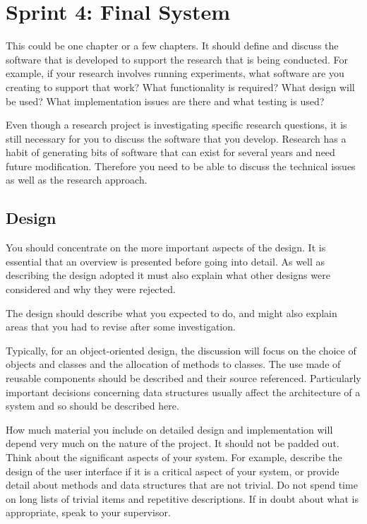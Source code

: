 \chapter{Sprint 4: Final System}

This could be one chapter or a few chapters. It should define and discuss the software that is developed to support the research that is being conducted. For example, if your research involves running experiments, what software are you creating to support that work? What functionality is required? What design will be used? What implementation issues are there and what testing is used? 

Even though a research project is investigating specific research questions, it is still necessary for you to discuss the software that you develop. Research has a habit of generating bits of software that can exist for several years and need future modification. Therefore you need to be able to discuss the technical issues as well as the research approach. 

\section{Design}
You should concentrate on the more important aspects of the design. It is essential that an overview is presented before going into detail. As well as describing the design adopted it must also explain what other designs were considered and why they were rejected.

The design should describe what you expected to do, and might also explain areas that you had to revise after some investigation.

Typically, for an object-oriented design, the discussion will focus on the choice of objects and classes and the allocation of methods to classes. The use made of reusable components should be described and their source referenced. Particularly important decisions concerning data structures usually affect the architecture of a system and so should be described here.

How much material you include on detailed design and implementation will depend very much on the nature of the project. It should not be padded out. Think about the significant aspects of your system. For example, describe the design of the user interface if it is a critical aspect of your system, or provide detail about methods and data structures that are not trivial. Do not spend time on long lists of trivial items and repetitive descriptions. If in doubt about what is appropriate, speak to your supervisor.
 
